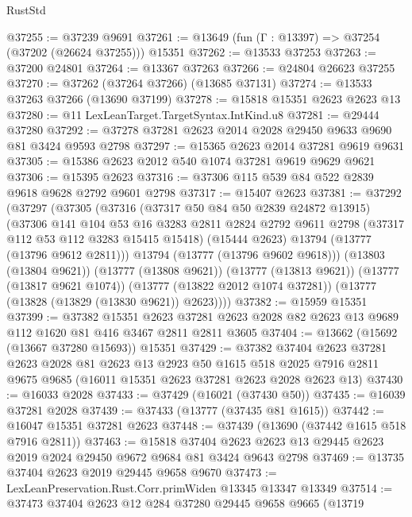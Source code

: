 \begin{lexlean}{RustStd}
\begin{coremodule}
@37255 := @37239 @9691
@37261 := @13649 (fun (Γ : @13397) => @37254 (@37202 (@26624 @37255))) @15351
@37262 := @13533 @37253
@37263 := @37200 @24801
@37264 := @13367 @37263
@37266 := @24804 @26623 @37255
@37270 := @37262 (@37264 @37266) (@13685 @37131)
@37274 := @13533 @37263 @37266 (@13690 @37199)
@37278 := @15818 @15351 @2623 @2623 @13
@37280 := @11 LexLeanTarget.TargetSyntax.IntKind.u8
@37281 := @29444 @37280
@37292 := @37278 @37281 @2623 @2014 @2028 @29450 @9633 @9690 @81 @3424 @9593 @2798
@37297 := @15365 @2623 @2014 @37281 @9619 @9631
@37305 := @15386 @2623 @2012 @540 @1074 @37281 @9619 @9629 @9621
@37306 := @15395 @2623
@37316 := @37306 @115 @539 @84 @522 @2839 @9618 @9628 @2792 @9601 @2798
@37317 := @15407 @2623
@37381 := @37292
    (@37297
      (@37305
        (@37316
          (@37317 @50 @84 @50 @2839 @24872 @13915)
          (@37306
            @141
            @104
            @53
            @16
            @3283
            @2811
            @2824
            @2792
            @9611
            @2798
            (@37317 @112 @53 @112 @3283 @15415 @15418)
            (@15444 @2623)
            @13794
            (@13777 (@13796 @9612 @2811)))
          @13794
          (@13777 (@13796 @9602 @9618)))
        (@13803 (@13804 @9621))
        (@13777 (@13808 @9621))
        (@13777 (@13813 @9621))
        (@13777 (@13817 @9621 @1074))
        (@13777 (@13822 @2012 @1074 @37281))
        (@13777 (@13828 (@13829 (@13830 @9621)) @2623))))
@37382 := @15959 @15351
@37399 := @37382
    @15351
    @2623
    @37281
    @2623
    @2028
    @82
    @2623
    @13
    @9689
    @112
    @1620
    @81
    @416
    @3467
    @2811
    @2811
    @3605
@37404 := @13662 (@15692 (@13667 @37280 @15693)) @15351
@37429 := @37382
    @37404
    @2623
    @37281
    @2623
    @2028
    @81
    @2623
    @13
    @2923
    @50
    @1615
    @518
    @2025
    @7916
    @2811
    @9675
    @9685
    (@16011 @15351 @2623 @37281 @2623 @2028 @2623 @13)
@37430 := @16033 @2028
@37433 := @37429 (@16021 (@37430 @50))
@37435 := @16039 @37281 @2028
@37439 := @37433 (@13777 (@37435 @81 @1615))
@37442 := @16047 @15351 @37281 @2623
@37448 := @37439 (@13690 (@37442 @1615 @518 @7916 @2811))
@37463 := @15818
    @37404
    @2623
    @2623
    @13
    @29445
    @2623
    @2019
    @2024
    @29450
    @9672
    @9684
    @81
    @3424
    @9643
    @2798
@37469 := @13735 @37404 @2623 @2019 @29445 @9658 @9670
@37473 := LexLeanPreservation.Rust.Corr.primWiden @13345 @13347 @13349
@37514 := @37473
    @37404
    @2623
    @12
    @284
    @37280
    @29445
    @9658
    @9665
    (@13719

\end{coremodule}
\end{lexlean}
